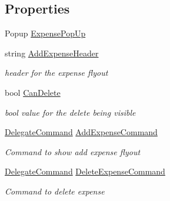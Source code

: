 \subsection*{Properties}
\begin{DoxyCompactItemize}
\item 
Popup \hyperlink{class_field_service_1_1_win_r_t_1_1_view_models_1_1_expense_view_model_aa998c39272a08e2538c4af7b4c422834}{Expense\+Pop\+Up}
\item 
string \hyperlink{class_field_service_1_1_win_r_t_1_1_view_models_1_1_expense_view_model_ac31e0abc380d5e8fbc884f4fc85e4e78}{Add\+Expense\+Header}
\begin{DoxyCompactList}\small\item\em header for the expense flyout \end{DoxyCompactList}\item 
bool \hyperlink{class_field_service_1_1_win_r_t_1_1_view_models_1_1_expense_view_model_adcd1efdda8898666d897d80ede1a945e}{Can\+Delete}
\begin{DoxyCompactList}\small\item\em bool value for the delete being visible \end{DoxyCompactList}\item 
\hyperlink{class_delegate_command}{Delegate\+Command} \hyperlink{class_field_service_1_1_win_r_t_1_1_view_models_1_1_expense_view_model_aea2d33005afb90e6b423aeba4e1fab1e}{Add\+Expense\+Command}
\begin{DoxyCompactList}\small\item\em Command to show add expense flyout \end{DoxyCompactList}\item 
\hyperlink{class_delegate_command}{Delegate\+Command} \hyperlink{class_field_service_1_1_win_r_t_1_1_view_models_1_1_expense_view_model_a2a1e4c02a121ff2e7fcb47f6415b8c51}{Delete\+Expense\+Command}
\begin{DoxyCompactList}\small\item\em Command to delete expense \end{DoxyCompactList}\item 

\end{DoxyCompactItemize}
